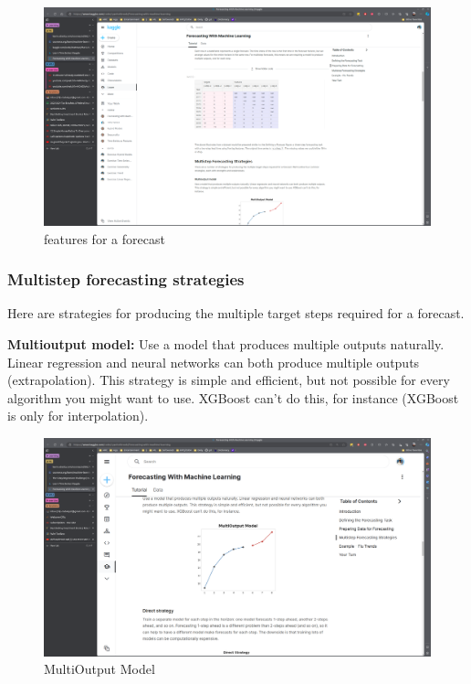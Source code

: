 \documentclass[12pt]{report}
\begin{document}
\begin{figure}[htbp]
  \begin{center}
    \includegraphics[trim =30cm 22.0cm 30cm 16.5cm, clip, scale=0.4]{pics/table.png}
    \caption{features for a forecast}
    \label{fig:table}
  \end{center}
\end{figure}

\subsubsection{Multistep forecasting strategies}
Here are strategies for producing the multiple target steps required for a forecast.


\textbf{Multioutput model:} Use a model that produces multiple outputs naturally. Linear regression and neural networks can both produce multiple outputs (extrapolation). This strategy is simple and efficient, but not possible for every algorithm you might want to use. XGBoost can't do this, for instance (XGBoost is only for interpolation).

\begin{figure}[htbp]
  \begin{center}
    \includegraphics[trim =35cm 14.0cm 33cm 19cm, clip, scale=0.2]{pics/forecast1.png}
    \caption{MultiOutput Model}
    \label{fig:multiouput}
  \end{center}
\end{figure}
\end{document}
